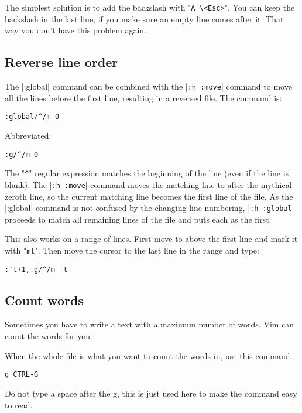 The simplest solution is to add the backslash with "\texttt{A \textbackslash{}<Esc>}".
You can keep the backslash in the last line, if you make sure an empty line comes after it.
That way you don't have this problem again.
\subsection{Reverse line order}

The |:global| command can be combined with the |\texttt{:h :move}| command to move all the lines before the first line, resulting in a reversed file.
The command is:

\begin{Verbatim}[samepage=true]
 :global/^/m 0
\end{Verbatim}

Abbreviated:

\begin{Verbatim}[samepage=true]
 :g/^/m 0
\end{Verbatim}

The "\texttt{\^{}}" regular expression matches the beginning of the line (even if the line is blank).
The |\texttt{:h :move}| command moves the matching line to after the mythical zeroth line, so the current matching line becomes the first line of the file.
As the |:global| command is not confused by the changing line numbering, |\texttt{:h :global}| proceeds to match all remaining lines of the file and puts each as the first.

This also works on a range of lines.
First move to above the first line and mark it with "\texttt{mt}".
Then move the cursor to the last line in the range and type:

\begin{Verbatim}[samepage=true]
 :'t+1,.g/^/m 't
\end{Verbatim}
\subsection{Count words}
Sometimes you have to write a text with a maximum number of words.
Vim can count the words for you.

When the whole file is what you want to count the words in, use this command:

\begin{Verbatim}[samepage=true]
 g CTRL-G
\end{Verbatim}

Do not type a space after the g, this is just used here to make the command easy to read.


